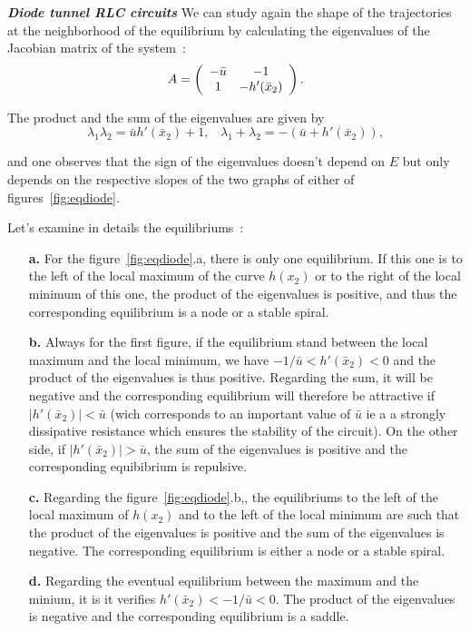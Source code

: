 \begin{exemple} {\bf  \em Diode tunnel RLC circuits}
We can study again the shape of the trajectories at the neighborhood of the equilibrium by calculating the eigenvalues of the Jacobian matrix of the system~:
$$A=\bma{cc} -\bar u & -1\\1&-h'(\bar x_2)\ema .$$

The product and the sum of the eigenvalues are given by
$$ \lambda_1\lambda_2=\bar u h'(\bar x_2) +1,  \;\;\; \lambda_1+\lambda_2=-(\bar u+
h'(\bar x_2)),$$

and one observes that the sign of the eigenvalues doesn't depend on $E$ but only depends on the respective slopes of the two graphs of either of figures~\ref{fig:eqdiode}.

Let's examine in details the equilibriums~:

\begin{itemize}

\item[{\bf a.}] For the figure~\ref{fig:eqdiode}.a, there is only one equilibrium. If this one 
is to the left of the local maximum of the curve $h(x_2)$ or to the right of the local minimum of this one, the product
of the eigenvalues is positive, and thus the corresponding equilibrium is a node or a stable spiral.

\item[{\bf b.} ] Always for the first figure, if the equilibrium stand between the local maximum and the local minimum, 
we have $-1/\bar u < h'(\bar x_2)<0$ and the product of the eigenvalues
is thus positive.
Regarding the sum, it will be negative and the corresponding equilibrium
will therefore be attractive if $|h'(\bar x_2)|<\bar u$ (wich corresponds to an important value of $\bar u$ ie a 
a strongly dissipative resistance which ensures the stability of the circuit). On the other side, if $|h'(\bar x_2)|>\bar u$,
the sum of the eigenvalues is positive and the corresponding equibibrium is repulsive.

\item[{\bf c.}] Regarding the figure~\ref{fig:eqdiode}.b,, the equilibriums to the left of the local maximum of 
$h(x_2)$ and to the left of the local minimum are such that the product of the eigenvalues is positive and the sum of the eigenvalues
is negative. The corresponding equilibrium is either a node or a stable spiral.

\item[{\bf d.}] Regarding the eventual equilibrium between the maximum and the minium, it is it verifies $h'(\bar x_2) < -1/\bar u < 0$. The product of the
eigenvalues is negative and the corresponding equilibrium is a saddle.


\end{itemize}
\end{exemple}
